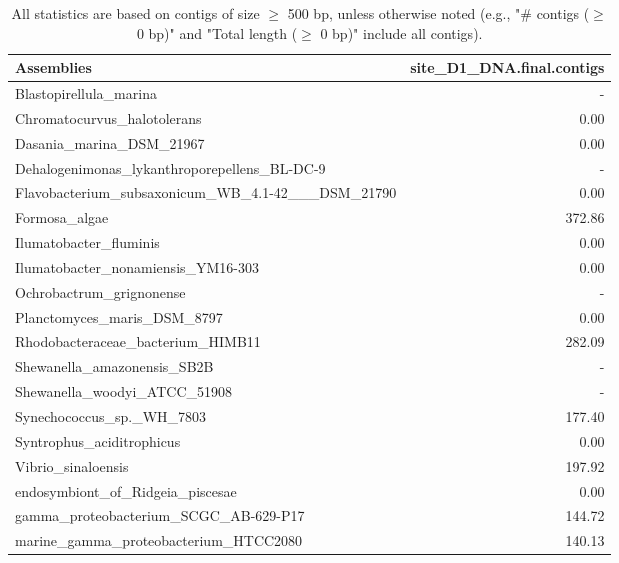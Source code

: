 \documentclass[12pt,a4paper]{article}
\begin{document}
\begin{table}[ht]
\begin{center}
\caption{All statistics are based on contigs of size $\geq$ 500 bp, unless otherwise noted (e.g., "\# contigs ($\geq$ 0 bp)" and "Total length ($\geq$ 0 bp)" include all contigs).}
\begin{tabular}{|l*{1}{|r}|}
\hline
Assemblies & site\_D1\_DNA.final.contigs \\ \hline
Blastopirellula\_marina & - \\ \hline
Chromatocurvus\_halotolerans & 0.00 \\ \hline
Dasania\_marina\_DSM\_21967 & 0.00 \\ \hline
Dehalogenimonas\_lykanthroporepellens\_BL-DC-9 & - \\ \hline
Flavobacterium\_subsaxonicum\_WB\_4.1-42\_\_\_DSM\_21790 & 0.00 \\ \hline
Formosa\_algae & 372.86 \\ \hline
Ilumatobacter\_fluminis & 0.00 \\ \hline
Ilumatobacter\_nonamiensis\_YM16-303 & 0.00 \\ \hline
Ochrobactrum\_grignonense & - \\ \hline
Planctomyces\_maris\_DSM\_8797 & 0.00 \\ \hline
Rhodobacteraceae\_bacterium\_HIMB11 & 282.09 \\ \hline
Shewanella\_amazonensis\_SB2B & - \\ \hline
Shewanella\_woodyi\_ATCC\_51908 & - \\ \hline
Synechococcus\_sp.\_WH\_7803 & 177.40 \\ \hline
Syntrophus\_aciditrophicus & 0.00 \\ \hline
Vibrio\_sinaloensis & 197.92 \\ \hline
endosymbiont\_of\_Ridgeia\_piscesae & 0.00 \\ \hline
gamma\_proteobacterium\_SCGC\_AB-629-P17 & 144.72 \\ \hline
marine\_gamma\_proteobacterium\_HTCC2080 & 140.13 \\ \hline
\end{tabular}
\end{center}
\end{table}
\end{document}
